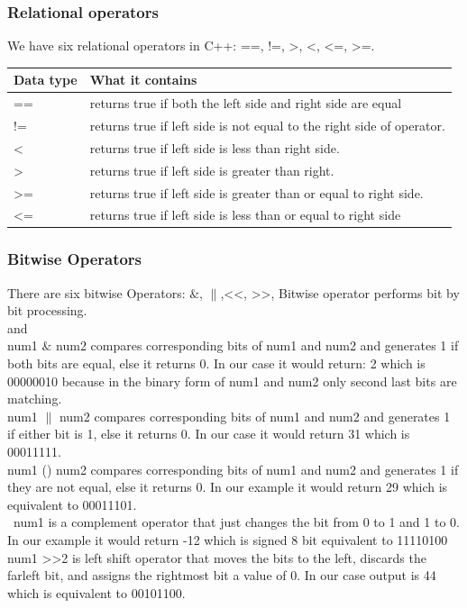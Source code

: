\documentclass[11pt, a4paper]{article}
\begin{document}
\subsubsection{Relational operators}
We have six relational operators in C++: ==, !=, \textgreater, \textless,  \textless =,
\textgreater =.

\begin{tabular}{ |p{3cm}||p{10cm}| }
    \hline
    \textbf{Data type} & \textbf{What it contains} \\
    \hline
    ==  & returns true if both the left side and right side are equal   \\
    != & returns true if left side is not equal to the right side of operator. \\
    \textless &returns true if left side is less than right side.\\
    \textgreater& returns true if left side is greater than right.  \\
    \textgreater = & returns true if left side is greater than or equal to right side.\\
    \textless = & returns true if left side is less than or equal to right side\\
    \hline
\end{tabular}

\subsubsection{Bitwise Operators}
There are six bitwise Operators: $\&$, $\|$,\textless\textless, \textgreater\textgreater,
Bitwise operator performs bit by bit processing.\\
 and \\
num1 $\&$ num2 compares corresponding bits of num1 and num2 and generates 1 if both bits
are equal, else it returns 0. In our case it would return: 2 which is 00000010 because
in the binary form of num1 and num2 only second last bits are matching.\\
num1 $\|$ num2 compares corresponding bits of num1 and num2 and generates 1 if either
bit is 1, else it returns 0. In our case it would return 31 which is 00011111.\\
num1 () num2 compares corresponding bits of num1 and num2 and generates 1 if they
are not equal, else it returns 0. In our example it would return 29 which is
equivalent to 00011101.\\
~num1 is a complement operator that just changes the bit from 0 to 1 and 1 to 0.
In our example it would return -12 which is signed 8 bit equivalent to 11110100\\
num1 \textgreater\textgreater 2 is left shift operator that moves the bits to the left,
discards the farleft bit, and assigns the rightmost bit a value of 0. In our case output is 44 which
is equivalent to 00101100.\\
\end{document}
